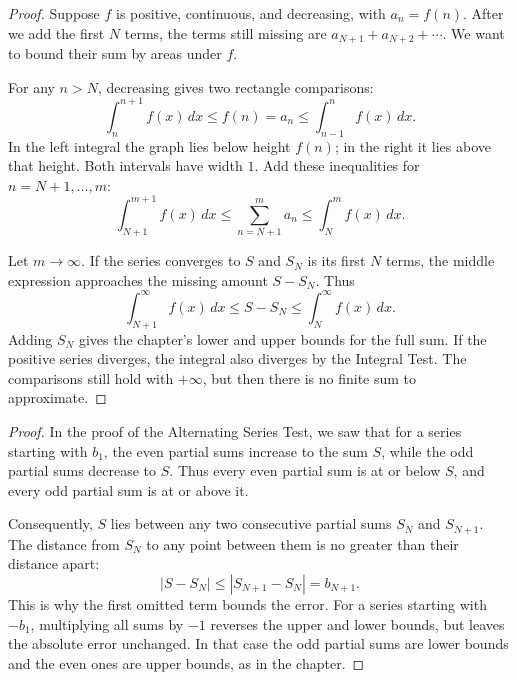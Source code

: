 
\begin{proof}
Suppose $f$ is positive, continuous, and decreasing, with $a_n=f(n)$.
After we add the first $N$ terms, the terms still missing are
$a_{N+1}+a_{N+2}+\cdots$. We want to bound their sum by areas under $f$.

For any $n>N$, decreasing gives two rectangle comparisons:
$$\int_n^{n+1}f(x)\,dx\leq f(n)=a_n
\leq\int_{n-1}^{n}f(x)\,dx.$$
In the left integral the graph lies below height $f(n)$; in the right
it lies above that height. Both intervals have width $1$.
Add these inequalities for $n=N+1,\ldots,m$:
$$\int_{N+1}^{m+1}f(x)\,dx
\leq\sum_{n=N+1}^m a_n
\leq\int_N^m f(x)\,dx.$$

Let $m\to\infty$. If the series converges to $S$ and $S_N$ is its first
$N$ terms, the middle expression approaches the missing amount $S-S_N$.
Thus
$$\int_{N+1}^\infty f(x)\,dx\leq S-S_N
\leq\int_N^\infty f(x)\,dx.$$
Adding $S_N$ gives the chapter's lower and upper bounds for the full
sum. If the positive series diverges, the integral also diverges by
the Integral Test. The comparisons still hold with $+\infty$, but then
there is no finite sum to approximate.
\end{proof}


\begin{proof}
In the proof of the Alternating Series Test, we saw that for a
series starting with $b_1$, the even partial sums increase to the sum
$S$, while the odd partial sums decrease to $S$. Thus every even partial
sum is at or below $S$, and every odd partial sum is at or above it.

Consequently, $S$ lies between any two consecutive partial sums $S_N$
and $S_{N+1}$. The distance from $S_N$ to any point between them is no
greater than their distance apart:
$$|S-S_N|\leq|S_{N+1}-S_N|=b_{N+1}.$$
This is why the first omitted term bounds the error. For a series
starting with $-b_1$, multiplying all sums by $-1$ reverses the upper
and lower bounds, but leaves the absolute error unchanged. In that
case the odd partial sums are lower bounds and the even ones are upper
bounds, as in the chapter.
\end{proof}


